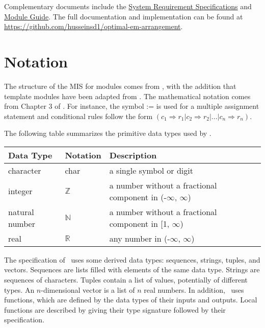 \documentclass[12pt, titlepage]{article}
\begin{document}
Complementary documents include the \href{https://github.com/husseinsd1/optimal-em-arrangement/blob/main/docs/SRS/SRS.pdf}{System Requirement Specifications} and \href{https://github.com/husseinsd1/optimal-em-arrangement/blob/main/docs/Design/SoftArchitecture/MG.pdf}{Module Guide}. The full documentation and implementation can be
found at \url{https://github.com/husseinsd1/optimal-em-arrangement}.

\section{Notation}
The structure of the MIS for modules comes from \citet{HoffmanAndStrooper1995},
with the addition that template modules have been adapted from
\cite{GhezziEtAl2003}.  The mathematical notation comes from Chapter 3 of
\citet{HoffmanAndStrooper1995}.  For instance, the symbol := is used for a
multiple assignment statement and conditional rules follow the form $(c_1
\Rightarrow r_1 | c_2 \Rightarrow r_2 | ... | c_n \Rightarrow r_n )$.

The following table summarizes the primitive data types used by \progname. 

\begin{center}
\renewcommand{\arraystretch}{1.2}
\noindent 
\begin{tabular}{l l p{7.5cm}} 
\toprule 
\textbf{Data Type} & \textbf{Notation} & \textbf{Description}\\ 
\midrule
character & char & a single symbol or digit\\
integer & $\mathbb{Z}$ & a number without a fractional component in (-$\infty$, $\infty$) \\
natural number & $\mathbb{N}$ & a number without a fractional component in [1, $\infty$) \\
real & $\mathbb{R}$ & any number in (-$\infty$, $\infty$)\\
\bottomrule
\end{tabular} 
\end{center}

\noindent
The specification of \progname \ uses some derived data types: sequences, strings,
tuples, and vectors. Sequences are lists filled with elements of the same data type. Strings
are sequences of characters. Tuples contain a list of values, potentially of
different types. An $n$-dimensional vector is a list of $n$ real numbers. In addition, \progname \ uses functions, which
are defined by the data types of their inputs and outputs. Local functions are
described by giving their type signature followed by their specification.
\end{document}

